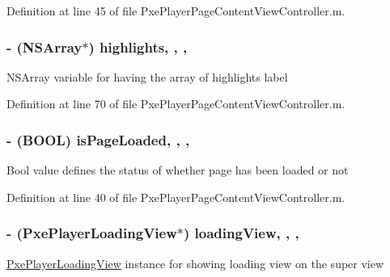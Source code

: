 Definition at line 45 of file Pxe\-Player\-Page\-Content\-View\-Controller.\-m.

\hypertarget{category_pxe_player_page_content_view_controller_07_08_af669d904b91e14ee5a23586242056f8f}{
\subsubsection[{highlights}]{\setlength{\rightskip}{0pt plus 5cm}-\/ (N\-S\-Array$\ast$) highlights\hspace{0.3cm}{\ttfamily [read]}, {\ttfamily [write]}, {\ttfamily [nonatomic]}, {\ttfamily [strong]}}}\label{category_pxe_player_page_content_view_controller_07_08_af669d904b91e14ee5a23586242056f8f}
N\-S\-Array variable for having the array of highlights label 

Definition at line 70 of file Pxe\-Player\-Page\-Content\-View\-Controller.\-m.

\hypertarget{category_pxe_player_page_content_view_controller_07_08_afd96b3c3ba599231417556b69275bdbc}{
\subsubsection[{is\-Page\-Loaded}]{\setlength{\rightskip}{0pt plus 5cm}-\/ (B\-O\-O\-L) is\-Page\-Loaded\hspace{0.3cm}{\ttfamily [read]}, {\ttfamily [write]}, {\ttfamily [nonatomic]}, {\ttfamily [assign]}}}\label{category_pxe_player_page_content_view_controller_07_08_afd96b3c3ba599231417556b69275bdbc}
Bool value defines the status of whether page has been loaded or not 

Definition at line 40 of file Pxe\-Player\-Page\-Content\-View\-Controller.\-m.

\hypertarget{category_pxe_player_page_content_view_controller_07_08_a12806241fb1086aa491618dd59071798}{
\subsubsection[{loading\-View}]{\setlength{\rightskip}{0pt plus 5cm}-\/ ({\bf Pxe\-Player\-Loading\-View}$\ast$) loading\-View\hspace{0.3cm}{\ttfamily [read]}, {\ttfamily [write]}, {\ttfamily [nonatomic]}, {\ttfamily [strong]}}}\label{category_pxe_player_page_content_view_controller_07_08_a12806241fb1086aa491618dd59071798}
\hyperlink{interface_pxe_player_loading_view}{Pxe\-Player\-Loading\-View} instance for showing loading view on the super view 

